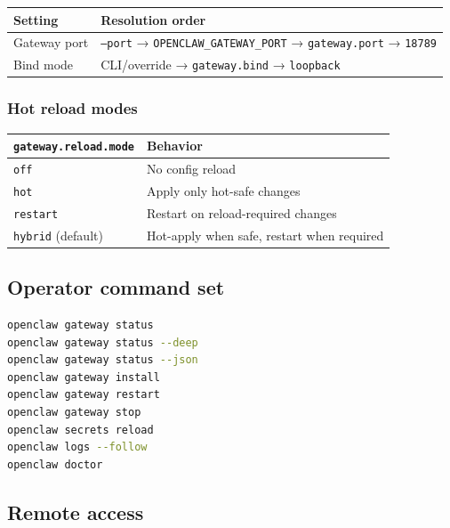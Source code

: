\begin{table}[h]
\centering
\small
\begin{tabular}{|l|l|}
\hline
Setting & Resolution order \\
\hline
Gateway port & \texttt{--port} → \texttt{OPENCLAW\_GATEWAY\_PORT} → \texttt{gateway.port} → \texttt{18789} \\
\hline
Bind mode & CLI/override → \texttt{gateway.bind} → \texttt{loopback} \\
\hline
\end{tabular}
\end{table}



\subsubsection{Hot reload modes}



\begin{table}[h]
\centering
\small
\begin{tabular}{|l|l|}
\hline
\texttt{gateway.reload.mode} & Behavior \\
\hline
\texttt{off} & No config reload \\
\hline
\texttt{hot} & Apply only hot-safe changes \\
\hline
\texttt{restart} & Restart on reload-required changes \\
\hline
\texttt{hybrid} (default) & Hot-apply when safe, restart when required \\
\hline
\end{tabular}
\end{table}



\subsection{Operator command set}


\begin{lstlisting}[language=bash]
openclaw gateway status
openclaw gateway status --deep
openclaw gateway status --json
openclaw gateway install
openclaw gateway restart
openclaw gateway stop
openclaw secrets reload
openclaw logs --follow
openclaw doctor
\end{lstlisting}


\subsection{Remote access}


